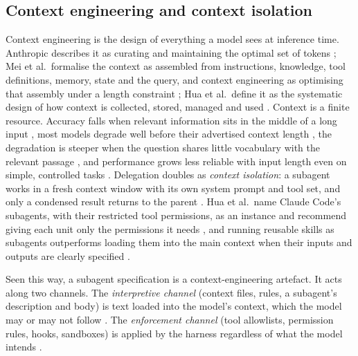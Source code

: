 \subsection{Context engineering and context isolation}
\label{sec:bg-context}
Context engineering is the design of everything a model sees at inference time. Anthropic describes it as curating
and maintaining the optimal set of tokens \citep{anthropic2025contextengineering}; Mei et al.\ formalise the context as
assembled from instructions, knowledge, tool definitions, memory, state and the query, and context engineering as
optimising that assembly under a length constraint \citep[\S3.1]{mei2025contextengineering}; Hua et al.\ define it as the
systematic design of how context is collected, stored, managed and used \citep[\S2.1]{hua2025contextengineering2}.
Context is a finite resource. Accuracy falls when relevant information sits in the middle of a long input
\citep{liu2024lost}, most models degrade well before their advertised context length \citep{hsieh2024ruler}, the
degradation is steeper when the question shares little vocabulary with the relevant passage
\citep{modarressi2025nolima}, and performance grows less reliable with input length even on simple, controlled tasks
\citep{hong2025contextrot}. Delegation doubles as \emph{context isolation}: a subagent works in a fresh
context window with its own system prompt and tool set, and only a condensed result returns to the parent
\citep{anthropic2025contextengineering}\citep[\S5.3.2]{hua2025contextengineering2}. Hua et al.\ name Claude Code's
subagents, with their restricted tool permissions, as an instance and recommend giving each unit only the permissions
it needs \citep[\S5.3.2]{hua2025contextengineering2}, and running reusable skills as subagents outperforms loading them
into the main context when their inputs and outputs are clearly specified \citep{piriyakulkij2026subagents}.

Seen this way, a subagent specification is a context-engineering artefact. It acts along two channels. The
\emph{interpretive channel} (context files, rules, a subagent's description and body) is text loaded into the model's
context, which the model may or may not follow \citep{AnthropicMemoryDoc}. The \emph{enforcement channel} (tool
allowlists, permission rules, hooks, sandboxes) is applied by the harness regardless of what the model intends
\citep{AnthropicPermissionsDoc}.

